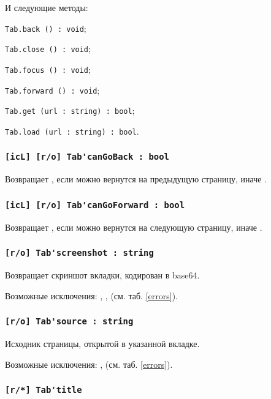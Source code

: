 И следующие методы:
\begin{icItems}
	\item \lstinline|Tab.back () : void|;
	\item \lstinline|Tab.close () : void|;
	\item \lstinline|Tab.focus () : void|;
	\item \lstinline|Tab.forward () : void|;
	\item \lstinline|Tab.get (url : string) : bool|;
	\item \lstinline|Tab.load (url : string) : bool|.
\end{icItems}

\subsubsection{\lstinline|[icL] [r/o] Tab'canGoBack : bool|}

Возвращает \true, если можно вернутся на предыдущую страницу, иначе \false.

\subsubsection{\lstinline|[icL] [r/o] Tab'canGoForward : bool|}

Возвращает \true, если можно вернутся на следующую страницу, иначе \false.

\subsubsection{\lstinline|[r/o] Tab'screenshot : string|}

Возвращает скриншот вкладки, кодирован в base64.

Возможные исключения: , ,  (см. таб. \ref{errors}).

\subsubsection{\lstinline|[r/o] Tab'source : string|}

Исходник страницы, открытой в указанной вкладке.

Возможные исключения: ,  (см. таб. \ref{errors}).

\subsubsection{\lstinline|[r/*] Tab'title|}

